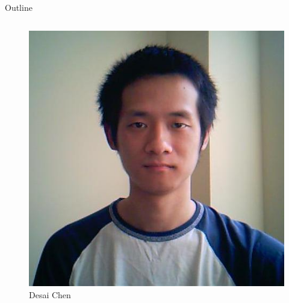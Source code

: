 \documentclass{beamer}
\begin{document}
\begin{frame}[t]{Outline}
\begin{columns}
\begin{column}{0.2\textwidth}
\begin{exampleblock}{}
\begin{figure}
        {\centering \includegraphics[scale=0.10]{desai.jpg}}\\
        Desai Chen\\


\end{figure}
\end{exampleblock}
\end{column}
\end{columns}
\end{frame}
\end{document}
